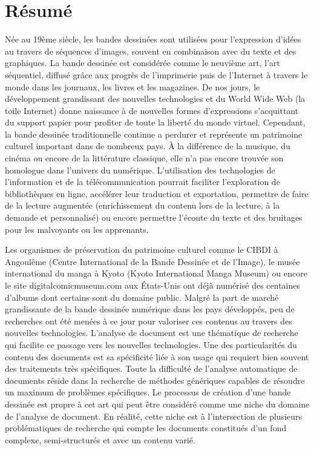 \chapter*{R{\'e}sum{\'e}}

Née au 19ème siècle, les bandes dessinées sont utilisées pour l'expression d'idées au travers de séquences d'images, souvent en combinaison avec du texte et des graphiques.
La bande dessinée est considérée comme le neuvième art, l'art séquentiel, diffusé grâce aux progrès de l'imprimerie puis de l'Internet à travers le monde dans les journaux, les livres et les magazines.
De nos jours, le développement grandissant des nouvelles technologies et du World Wide Web (la toile Internet) donne naissance à de nouvelles formes d'expressions s'acquittant du support papier pour profiter de toute la liberté du monde virtuel.
Cependant, la bande dessinée traditionnelle continue a perdurer et représente un patrimoine culturel important dans de nombreux pays.
À la différence de la musique, du cinéma ou encore de la littérature classique, elle n'a pas encore trouvée son homologue dans l'univers du numérique.
L'utilisation des technologies de l'information et de la télécommunication pourrait faciliter l'exploration de bibliothèques en ligne, accélérer leur traduction et exportation, permettre de faire de la lecture augmentée (enrichissement du contenu lors de la lecture, à la demande et personnalisé) ou encore permettre l'écoute du texte et des bruitages pour les malvoyants ou les apprenants.

Les organismes de préservation du patrimoine culturel comme le CIBDI à Angoulême (Centre International de la Bande Dessinée et de l'Image), le musée international du manga à Kyoto (Kyoto International Manga Museum) ou encore le site digitalcomicmuseum.com aux États-Unis ont déjà numérisé des centaines d'albums dont certains sont du domaine public.
Malgré la part de marché grandissante de la bande dessinée numérique dans les pays développés, peu de recherches ont été menées à ce jour pour valoriser ces contenus au travers des nouvelles technologies.
L'analyse de document est une thématique de recherche qui facilite ce passage vers les nouvelles technologies.
Une des particularités du contenu des documents est sa spécificité liée à son usage qui requiert bien souvent des traitements très spécifiques.
Toute la difficulté de l'analyse automatique de documents réside dans la recherche de méthodes génériques capables de résoudre un maximum de problèmes spécifiques.
Le processus de création d'une bande dessinée est propre à cet art qui peut être considéré comme une niche du domaine de l'analyse de document.
En réalité, cette niche est à l'intersection de plusieurs problématiques de recherche qui compte les documents constitués d'un fond complexe, semi-structurés et avec un contenu varié.

